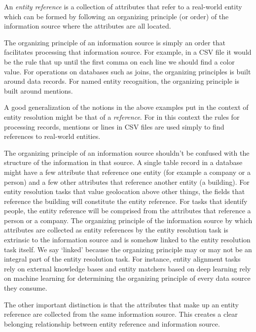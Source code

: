 \documentclass[lettersize,journal]{IEEEtran}
\begin{document}
    \begin{defn}
        An \textit{entity reference} is a collection of attributes that refer
        to a real-world entity which can be formed by following an organizing
        principle (or order) of the information source where the attributes are
        all located.
    \end{defn}

    The organizing principle of an information source is simply an order that
    facilitates processing that information source.
    For example, in a CSV file it would be the rule that up until the first
    comma on each line we should find a color value.
    For operations on databases such as joins, the organizing principles is
    built around data records.
    For named entity recognition, the organizing principle is built around
    mentions.

    A good generalization of the notions in the above examples put in the
    context of entity resolution might be that of a
    \textit{reference}\cite{Ben2009Swoosh}.
    For in this context the rules for processing records, mentions or lines in
    CSV files are used simply to find references to real-world entities.

    The organizing principle of an information source shouldn't be confused with
    the structure of the information in that source.
    A single table record in a database might have a few attribute that
    reference one entity (for example a company or a person) and a few other
    attributes that reference another entity (a building).
    For entity resolution tasks that value geolocation above other things, the 
    fields that reference the building will constitute the entity reference.
    For tasks that identify people, the entity reference will be comprised from
    the attributes that reference a person or a company.
    The organizing principle of the information source by which attributes are
    collected as entity references by the entity resolution task is extrinsic to
    the information source and is somehow linked to the entity resolution task
    itself.
    We say `linked' because the organizing principle may or may not be an
    integral part of the entity resolution task.
    For instance, entity alignment tasks rely on external knowledge bases and
    entity matchers based on deep learning rely on machine learning for
    determining the organizing principle of every data source they consume.

    The other important distinction is that the attributes that make up an
    entity reference are collected from the same information source.
    This creates a clear belonging relationship between entity reference and
    information source.
    
\end{document}
